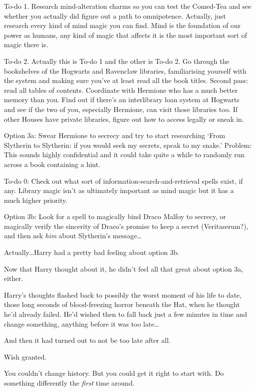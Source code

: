 \begin{em}
To-do 1. Research mind-alteration charms so you can test the Comed-Tea and see whether you actually did figure out a path to omnipotence. Actually, just research every kind of mind magic you can find. Mind is the foundation of our power as humans, any kind of magic that affects it is the most important sort of magic there is.

To-do 2. Actually this is To-do 1 and the other is To-do 2. Go through the bookshelves of the Hogwarts and Ravenclaw libraries, familiarising yourself with the system and making sure you’ve at least read all the book titles. Second pass: read all tables of contents. Coordinate with Hermione who has a much better memory than you. Find out if there’s an interlibrary loan system at Hogwarts and see if the two of you, especially Hermione, can visit those libraries too. If other Houses have private libraries, figure out how to access legally or sneak in.

Option 3a: Swear Hermione to secrecy and try to start researching ‘From Slytherin to Slytherin: if you would seek my secrets, speak to my snake.’ Problem: This sounds highly confidential and it could take quite a while to randomly run across a book containing a hint.

To-do 0: Check out what sort of information-search-and-retrieval spells exist, if any. Library magic isn’t as ultimately important as mind magic but it has a much higher priority.

Option 3b: Look for a spell to magically bind Draco Malfoy to secrecy, or magically verify the sincerity of Draco’s promise to keep a secret (Veritaserum?), and then ask \emph{him} about Slytherin’s message…
\end{em}

Actually…Harry had a pretty bad feeling about option 3b.

Now that Harry thought about it, he didn’t feel all that great about option 3a, either.

Harry’s thoughts flashed back to possibly the worst moment of his life to date, those long seconds of blood-freezing horror beneath the Hat, when he thought he’d already failed. He’d wished then to fall back just a few minutes in time and change something, anything before it was too late…

And then it had turned out to not be too late after all.

Wish granted.

You couldn’t change history. But you could get it right to start with. Do something differently the \emph{first} time around.

